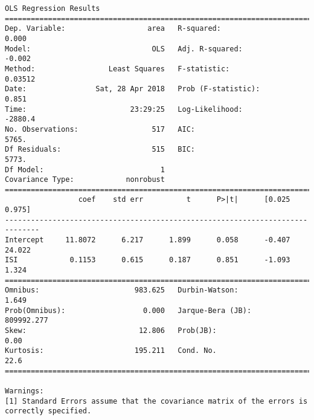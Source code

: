 \documentclass[11pt]{article}
\begin{document}
\begin{Verbatim}[commandchars=\\\{\}]
                            OLS Regression Results                            
==============================================================================
Dep. Variable:                   area   R-squared:                       0.000
Model:                            OLS   Adj. R-squared:                 -0.002
Method:                 Least Squares   F-statistic:                   0.03512
Date:                Sat, 28 Apr 2018   Prob (F-statistic):              0.851
Time:                        23:29:25   Log-Likelihood:                -2880.4
No. Observations:                 517   AIC:                             5765.
Df Residuals:                     515   BIC:                             5773.
Df Model:                           1                                         
Covariance Type:            nonrobust                                         
==============================================================================
                 coef    std err          t      P>|t|      [0.025      0.975]
------------------------------------------------------------------------------
Intercept     11.8072      6.217      1.899      0.058      -0.407      24.022
ISI            0.1153      0.615      0.187      0.851      -1.093       1.324
==============================================================================
Omnibus:                      983.625   Durbin-Watson:                   1.649
Prob(Omnibus):                  0.000   Jarque-Bera (JB):           809992.277
Skew:                          12.806   Prob(JB):                         0.00
Kurtosis:                     195.211   Cond. No.                         22.6
==============================================================================

Warnings:
[1] Standard Errors assume that the covariance matrix of the errors is correctly specified.



\end{Verbatim}
\end{document}
